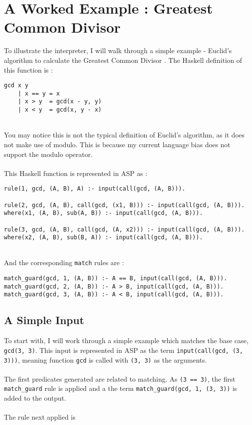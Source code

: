 \section{A Worked Example : Greatest Common Divisor}

To illustrate the interpreter, I will walk through a simple example - Euclid's algorithm to calculate the Greatest Common Divisor \cite{Euclid}. The Haskell definition of this function is : \\

\begin{lstlisting}
gcd x y
	| x == y = x
	| x > y  = gcd(x - y, y)
	| x < y  = gcd(x, y - x)
\end{lstlisting}
\mbox{} \\
You may notice this is not the typical definition of Euclid's algorithm, as it does not make use of modulo. This is because my current language bias does not support the modulo operator. \\ \\
This Haskell function is represented in ASP as :\\

\begin{lstlisting}
rule(1, gcd, (A, B), A) :- input(call(gcd, (A, B))).

rule(2, gcd, (A, B), call(gcd, (x1, B))) :- input(call(gcd, (A, B))).
where(x1, (A, B), sub(A, B)) :- input(call(gcd, (A, B))).

rule(3, gcd, (A, B), call(gcd, (A, x2))) :- input(call(gcd, (A, B))).
where(x2, (A, B), sub(B, A)) :- input(call(gcd, (A, B))).
\end{lstlisting}
\mbox{} \\
And the corresponding \lstinline{match} rules are :\\ %

\begin{lstlisting}
match_guard(gcd, 1, (A, B)) :- A == B, input(call(gcd, (A, B))).
match_guard(gcd, 2, (A, B)) :- A > B, input(call(gcd, (A, B))).
match_guard(gcd, 3, (A, B)) :- A < B, input(call(gcd, (A, B))).
\end{lstlisting}

\subsection{A Simple Input}
To start with, I will work through a simple example which matches the base case, \lstinline{gcd(3, 3)}. This input is represented in ASP as the term \lstinline{input(call(gcd, (3, 3)))}, meaning function \lstinline{gcd} is called with \lstinline{(3, 3)} as the arguments. \\ \\
The first predicates generated are related to matching. As \lstinline{(3 == 3)}, the first \lstinline{match_guard} rule is applied and a the term \lstinline{match_guard(gcd, 1, (3, 3))} is added to the output.\\ \\ %
The rule next applied is \\

